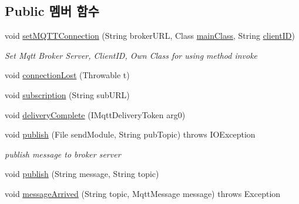 \subsection*{Public 멤버 함수}
\begin{DoxyCompactItemize}
\item 
void \mbox{\hyperlink{classcom_1_1github_1_1aites_1_1framework_1_1communicate_1_1_data_transfer_a7885fd92b18891995e9030d238a06ff4}{set\+M\+Q\+T\+T\+Connection}} (String broker\+U\+RL, Class \mbox{\hyperlink{classcom_1_1github_1_1aites_1_1framework_1_1communicate_1_1_data_transfer_aaf2d39cfff3efab5f33efb759918a3fe}{main\+Class}}, String \mbox{\hyperlink{classcom_1_1github_1_1aites_1_1framework_1_1communicate_1_1_data_transfer_a5aa04d84db8a69443856393e4fcaa941}{client\+ID}})
\begin{DoxyCompactList}\small\item\em Set Mqtt Broker Server, Client\+ID, Own Class for using method invoke \end{DoxyCompactList}\item 
void \mbox{\hyperlink{classcom_1_1github_1_1aites_1_1framework_1_1communicate_1_1_data_transfer_a0e54b0d0b30e79b692f98305597d801b}{connection\+Lost}} (Throwable t)
\item 
void \mbox{\hyperlink{classcom_1_1github_1_1aites_1_1framework_1_1communicate_1_1_data_transfer_a0abe3b63a6065ea2f43acecf7bb7ff36}{subscription}} (String sub\+U\+RL)
\item 
void \mbox{\hyperlink{classcom_1_1github_1_1aites_1_1framework_1_1communicate_1_1_data_transfer_a17bbdd240fada147c250e0ca844c2e66}{delivery\+Complete}} (I\+Mqtt\+Delivery\+Token arg0)
\item 
void \mbox{\hyperlink{classcom_1_1github_1_1aites_1_1framework_1_1communicate_1_1_data_transfer_a90bd50b85b1d619ef9bcf4720b3a1c27}{publish}} (File send\+Module, String pub\+Topic)  throws I\+O\+Exception
\begin{DoxyCompactList}\small\item\em publish message to broker server \end{DoxyCompactList}\item 
void \mbox{\hyperlink{classcom_1_1github_1_1aites_1_1framework_1_1communicate_1_1_data_transfer_a9604c756c4bb95a16676a98625216c12}{publish}} (String message, String topic)
\item 
void \mbox{\hyperlink{classcom_1_1github_1_1aites_1_1framework_1_1communicate_1_1_data_transfer_afa466c8ca581d25f704d4a530ab921e9}{message\+Arrived}} (String topic, Mqtt\+Message message)  throws Exception 

\end{DoxyCompactItemize}
